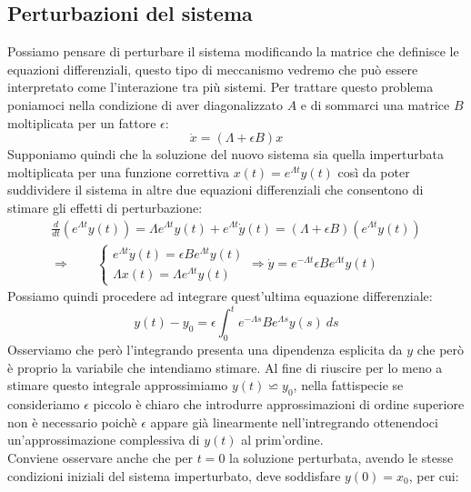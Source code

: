 \subsection{Perturbazioni del sistema}

Possiamo pensare di perturbare il sistema modificando la matrice che definisce le equazioni differenziali, questo tipo di meccanismo vedremo che può essere interpretato come l'interazione tra più sistemi. Per trattare questo problema poniamoci nella condizione di aver diagonalizzato $A$ e di sommarci una matrice $B$ moltiplicata per un fattore $\epsilon$:
\begin{equation}
	\dot{x}=(\Lambda+\epsilon B)x
\end{equation}
Supponiamo quindi che la soluzione del nuovo sistema sia quella imperturbata moltiplicata per una funzione correttiva $x(t)=e^{\Lambda t}y(t)$ così da poter suddividere il sistema in altre due equazioni differenziali che consentono di stimare gli effetti di perturbazione:
\begin{equation*}
	\begin{gathered}
		\frac{d}{dt}(e^{\Lambda t}y(t))=\Lambda e^{\Lambda t}y(t)+e^{\Lambda t}\dot{y}(t)=(\Lambda+\epsilon B)(e^{\Lambda t}y(t))\\
		\Rightarrow \qquad 
		\begin{cases}
			e^{\Lambda t}\dot{y}(t)=\epsilon Be^{\Lambda t}y(t)\\
			\Lambda x(t)=\Lambda e^{\Lambda t}y(t)
		\end{cases}
	\Rightarrow \dot{y}=e^{-\Lambda t}\epsilon B e^{\Lambda t} y(t)
	\end{gathered}
\end{equation*}
Possiamo quindi procedere ad integrare quest'ultima equazione differenziale:
\begin{equation}
	y(t)-y_0=\epsilon\int_{0}^{t}e^{-\Lambda s} B e^{\Lambda s} y(s)\ ds
\end{equation}
Osserviamo che però l'integrando presenta una dipendenza esplicita da $y$ che però è proprio la variabile che intendiamo stimare. Al fine di riuscire per lo meno a stimare questo integrale approssimiamo $y(t) \backsimeq y_0$, nella fattispecie se consideriamo $\epsilon$ piccolo è chiaro che introdurre approssimazioni di ordine superiore non è necessario poichè $\epsilon$ appare già linearmente nell'intregrando ottenendoci un'approssimazione complessiva di $y(t)$ al prim'ordine.\\
Conviene osservare anche che per $t=0$ la soluzione perturbata, avendo le stesse condizioni iniziali del sistema imperturbato, deve soddisfare $y(0)=x_0$, per cui:
